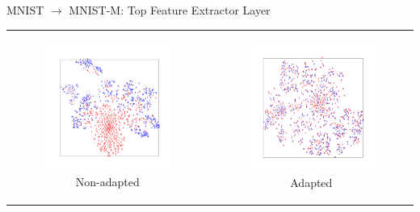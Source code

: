 \documentclass{beamer}
\begin{document}
\begin{frame}{\centering \large MNIST $\rightarrow$ MNIST-M: Top Feature Extractor Layer}
\centering

\begin{adjustbox}{max width=\textwidth}
\begin{tabular}{cc}
\begin{subfigure}[t]{0.45\textwidth}
    \centering
    \includegraphics[width=\linewidth]{Source-only.png}
    \caption{Non-adapted}
\end{subfigure}
&
\begin{subfigure}[t]{0.45\textwidth}
    \centering
    \includegraphics[width=\linewidth]{DANN.png}
    \caption{Adapted}
\end{subfigure}
\end{tabular}
\end{adjustbox}


\end{frame}
\end{document}
